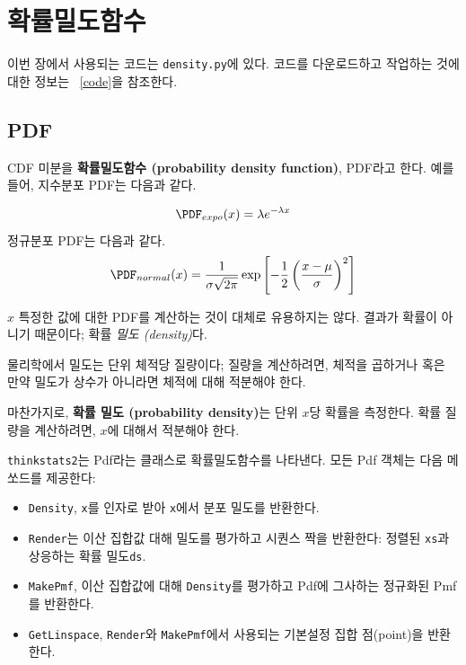 
\chapter{확률밀도함수}
\label{density}


이번 장에서 사용되는 코드는 {\tt density.py}에 있다.
코드를 다운로드하고 작업하는 것에 대한 정보는 ~\ref{code}을 참조한다.

\section{PDF}

CDF 미분을 {\bf 확률밀도함수 (probability density function)}, PDF라고 한다.
예를 들어, 지수분포 PDF는 다음과 같다.

%
\[ \PDF_{expo}(x) = \lambda e^{-\lambda x}   \]
%
정규분포 PDF는 다음과 같다.
%
\[ \PDF_{normal}(x) = \frac{1}{\sigma \sqrt{2 \pi}} 
                 \exp \left[ -\frac{1}{2} 
                 \left( \frac{x - \mu}{\sigma} \right)^2 \right]  \]
%

$x$ 특정한 값에 대한 PDF를 계산하는 것이 대체로 유용하지는 않다. 결과가 확률이 아니기 때문이다; 확률 {\em 밀도 (density)}다.

물리학에서 밀도는 단위 체적당 질량이다; 질량을 계산하려면, 체적을 곱하거나 혹은 만약 밀도가 상수가 아니라면 체적에 대해 적분해야 한다.

마찬가지로, {\bf 확률 밀도 (probability density)}는 단위 $x$당 확률을 측정한다. 확률 질량을 계산하려면, $x$에 대해서 적분해야 한다. 

{\tt thinkstats2}는 Pdf라는 클래스로 확률밀도함수를 나타낸다.
모든 Pdf 객체는 다음 메쏘드를 제공한다:

\begin{itemize}

\item {\tt Density}, {\tt x}를 인자로 받아 {\tt x}에서 분포 밀도를 반환한다.

\item {\tt Render}는 이산 집합값 대해 밀도를 평가하고 시퀀스 짝을 반환한다: 정렬된 {\tt xs}과 상응하는 확률 밀도{\tt ds}.

\item {\tt MakePmf}, 이산 집합값에 대해 {\tt Density}를 평가하고 Pdf에 그사하는 정규화된 Pmf를 반환한다.

\item {\tt GetLinspace}, {\tt Render}와 {\tt MakePmf}에서 사용되는 기본설정 집합 점(point)을 반환한다.

\end{itemize}  

